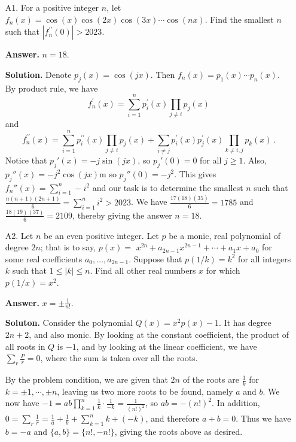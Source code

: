 \documentclass[11pt,a4paper]{article}
\begin{document}
	\begin{enumerate}
		\item [A1.] 
		For a positive integer $n$, let $f_n(x)=\cos (x) \cos (2 x) \cos (3 x) \cdots \cos (n x)$. Find the smallest $n$ such that $\left|f_n^{\prime \prime}(0)\right|>2023$.
		
		\textbf{Answer.} $n=18$. 
		
		\textbf{Solution.} 
		Denote $p_j(x)=\cos(jx)$. 
		Then $f_n(x)=p_1(x)\cdots p_n(x)$. 
		By product rule, we have 
		\[f_n^{\prime}(x) = \sum_{i=1}^n p_i^{\prime}(x)\prod_{j\neq i} p_j(x)
		\]
		and 
		\[f_n^{\prime\prime}(x) = \sum_{i=1}^n p_i^{\prime\prime }(x)\prod_{j\neq i} p_j(x) + 
		\sum_{i\neq j}p_i^{\prime}(x)p_j^{\prime}(x) \prod_{k\ne i, j}p_k(x)\,.
		\]
		Notice that $p_j'(x)=-j\sin(jx)$, so $p_j'(0)=0$ for all $j\ge 1$. 
		Also, $p_j''(x)=-j^2\cos(jx)$m so $p_j''(0)=-j^2$. 
		This gives $f_n''(x)=\sum_{i=1}^n -i^2$ and our task is to determine the smallest $n$ such that 
		$\frac{n(n+1)(2n+1)}{6}=\sum_{i=1}^n i^2 > 2023$. 
		We have $\frac{17(18)(35)}{6}=1785$ and $\frac{18(19)(37)}{6}=2109$, 
		thereby giving the answer $n=18$. 
		
		\item [A2.]
		Let $n$ be an even positive integer. Let $p$ be a monic, real polynomial of degree $2 n$; that is to say, $p(x)=$ $x^{2 n}+a_{2 n-1} x^{2 n-1}+\cdots+a_1 x+a_0$ for some real coefficients $a_0, \ldots, a_{2 n-1}$. Suppose that $p(1 / k)=k^2$ for all integers $k$ such that $1 \leq|k| \leq n$. Find all other real numbers $x$ for which $p(1 / x)=x^2$.
		
		\textbf{Answer.} $x = \pm \frac {1}{n!}$. 
		
		\textbf{Soluton.} 
		Consider the polynomial $Q(x) = x^2p(x) - 1$. 
		It has degree $2n + 2$, and also monic. 
		By looking at the constant coefficient, the product of all roots in $Q$ is $-1$, 
		and by looking at the linear coefficient, we have $\sum_r \frac{P}{r} = 0$, 
		where the sum is taken over all the roots. 
		
		By the problem condition, we are given that $2n$ of the roots are 
		$\frac{1}{k}$ for $k=\pm 1, \cdots, \pm n$, 
		leaving us two more roots to be found, namely $a$ and $b$. 
		We now have $-1 = ab\prod_{k=1}^n \frac{1}{k}\cdot \frac{1}{-k} = \frac{1}{(n!)^2}$, 
		so $ab = -(n!)^2$. 
		In addition, $0= \sum_r \frac{1}{r} = \frac{1}{a} + \frac{1}{b} + \sum_{k=1}^n k + (-k)$, 
		and therefore $a + b = 0$. 
		Thus we have $b = -a$ and $\{a, b\} = \{n!, -n!\}$, 
		giving the roots above as desired. 
		

\end{enumerate}
\end{document}
